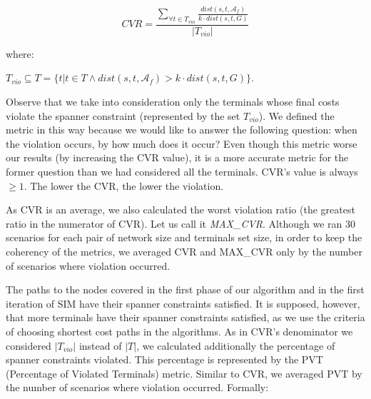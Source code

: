 \begin{equation}
\label{eq:cost_violation_ratio}
  CVR = \frac{\sum_{\forall t \in T_{vio}}\frac{dist(s,t,\mathcal{A}_f)}{k \cdot dist(s,t,G)}}{|T_{vio}|}
\end{equation}

where: %
\begin{center}
 $T_{vio} \subseteq T = \lbrace t | t \in T \wedge dist(s,t,\mathcal{A}_f) > k \cdot dist(s,t,G) \rbrace$. 
\end{center}

Observe that we take into consideration only the terminals whose final costs violate the spanner constraint 
(represented by the set $T_{vio}$). We defined the metric in this way because we would like to answer the following question: when the violation occurs, by how much does it occur? 
Even though this metric worse our results
(by increasing the CVR value), it is a more accurate metric for the former question than we had considered all the terminals. CVR's value is always 
$\ge 1$. The lower the CVR, the lower the violation. 

As CVR is an average, we also calculated the worst violation ratio (the greatest ratio in the numerator of CVR). Let us call it \emph{MAX\_CVR}. 
Although we ran 30 scenarios for each pair of network size and terminals set size, in order to keep the coherency of the metrics, we averaged CVR and MAX\_CVR only by the number of scenarios where violation occurred. 

The paths to the nodes covered in the first phase of our algorithm and in the first iteration of SIM have their spanner constraints
satisfied. It is supposed, however, that more terminals have their spanner constraints satisfied, as we use the criteria 
of choosing shortest cost paths in the algorithms. 
As in CVR's denominator we considered $|T_{vio}|$ instead of $|T|$, 
we calculated additionally the percentage of spanner constraints violated. 
This percentage is represented by the PVT (Percentage of Violated Terminals) metric. 
Similar to CVR, we averaged PVT by the number of scenarios where violation occurred. 
Formally: 


